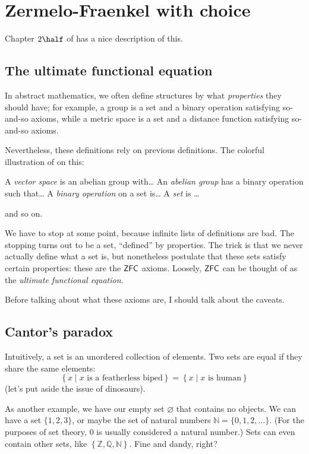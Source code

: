 \chapter{Zermelo-Fraenkel with choice}
Chapter $2\half$ of \cite{ref:msci} has a nice description of this.

\section{The ultimate functional equation}
In abstract mathematics, we often define structures by what \emph{properties}
they should have; for example, a group is a set and a binary operation
satisfying so-and-so axioms, while a metric space is a set and a distance function
satisfying so-and-so axioms.

Nevertheless, these definitions rely on previous definitions.
The colorful illustration of \cite{ref:msci} on this:
\begin{itemize}
	\ii A \emph{vector space} is an abelian group with\dots
	\ii An \emph{abelian group} has a binary operation such that\dots
	\ii A \emph{binary operation} on a set is\dots
	\ii A \emph{set} is \dots
\end{itemize}
and so on.

We have to stop at some point, because infinite lists of definitions are bad.
The stopping turns out to be a set, ``defined'' by properties.
The trick is that we never actually define what a set is,
but nonetheless postulate that these sets satisfy certain properties:
these are the $\mathsf{ZFC}$ axioms.
Loosely, $\mathsf{ZFC}$ can be thought of as the \emph{ultimate functional equation}.

Before talking about what these axioms are, I should talk about the caveats.

\section{Cantor's paradox}
Intuitively, a set is an unordered collection of elements.
Two sets are equal if they share the same elements:
\[
	\left\{ x \mid x \text{ is a featherless biped} \right\}
	=
	\left\{ x \mid x \text{ is human} \right\}
\]
(let's put aside the issue of dinosaurs).

As another example, we have our empty set $\varnothing$ that contains no objects.
We can have a set $\{1, 2, 3\}$, or maybe the set of natural numbers $\mathbb N = \{0, 1, 2, \dots \}$.
(For the purposes of set theory, $0$ is usually considered a natural number.)
Sets can even contain other sets, like $\left\{ \mathbb Z, \mathbb Q, \mathbb N \right\}$. Fine and dandy, right?

